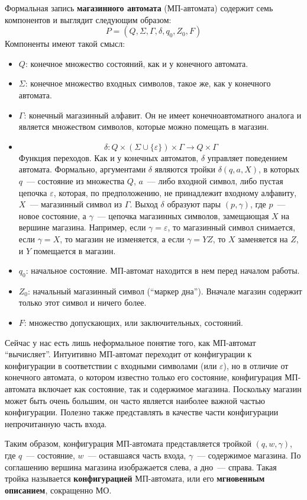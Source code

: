 \documentclass[a4paper,12pt]{article}
\begin{document}
	Формальная запись \textbf{магазинного автомата} (МП-автомата) содержит семь компонентов и выглядит следующим образом:
	\[P = (Q, \Sigma, \Gamma, \delta, q_0, Z_0, F)\]
	Компоненты имеют такой смысл:
	\begin{itemize}
		\item $Q$: конечное множество состояний, как и у конечного автомата.
		\item $\Sigma$: конечное множество входных символов, такое же, как у конечного автомата.
		\item $\Gamma$: конечный магазинный алфавит. Он не имеет конечноавтоматного аналога и является множеством символов, которые можно помещать в магазин.
		\item \[\delta : Q \times (\Sigma \cup  \{\varepsilon\}) \times \Gamma \to Q \times \Gamma\] Функция переходов. Как и у конечных автоматов, $\delta$ управляет поведением автомата. Формально, аргументами $\delta$ являются тройки $\delta(q, a, X)$, в которых $q$~--- состояние из множества $Q$, $a$~--- либо входной символ, либо пустая цепочка $\varepsilon$, которая, по предположению, не принадлежит входному алфавиту, $X$~--- магазинный символ из $\Gamma$. Выход $\delta$ образуют пары $(p, \gamma)$, где $p$~--- новое состояние, а $\gamma$~--- цепочка магазинных символов, замещающая $X$ на вершине магазина. Например, если $\gamma = \varepsilon$, то магазинный символ снимается, если $\gamma = X$, то магазин не изменяется, а если $\gamma = YZ$, то $X$ заменяется на $Z$, и $Y$ помещается в магазин.
		\item $q_0$: начальное состояние. МП-автомат находится в нем перед началом работы.
		\item $Z_0$: начальный магазинный символ (``маркер дна''). Вначале магазин содержит только этот символ и ничего более.
		\item $F$: множество допускающих, или заключительных, состояний.
	\end{itemize}
	Сейчас у нас есть лишь неформальное понятие того, как МП-автомат “вычисляет”. Интуитивно МП-автомат переходит от конфигурации к конфигурации в соответствии с входными символами (или $\varepsilon$), но в отличие от конечного автомата, о котором известно только его состояние, конфигурация МП-автомата включает как состояние, так и содержимое магазина. Поскольку магазин может быть очень большим, он часто является наиболее важной частью конфигурации. Полезно также представлять в качестве части конфигурации непрочитанную часть входа.
	
	Таким образом, конфигурация МП-автомата представляется тройкой $(q, w, \gamma)$, где $q$~--- состояние, $w$~--- оставшаяся часть входа, $\gamma$~--- содержимое магазина. По соглашению вершина магазина изображается слева, а дно~--- справа. Такая тройка называется \textbf{конфигурацией} МП-автомата, или его \textbf{мгновенным описанием}, сокращенно МО.
	
\end{document}
